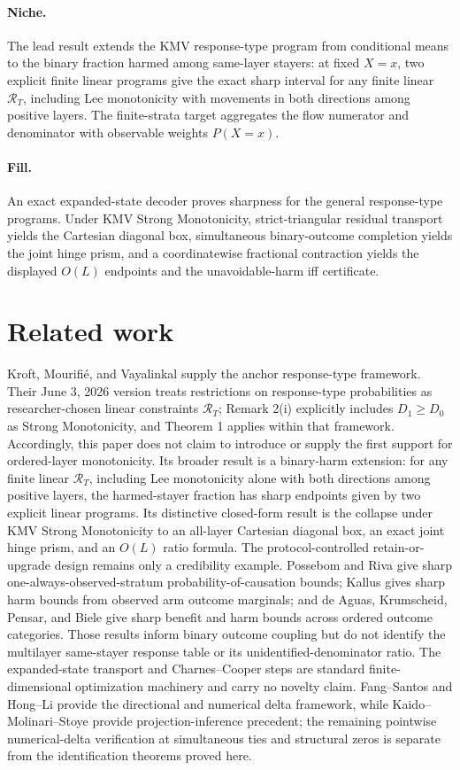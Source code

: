 \documentclass{article}
\begin{document}
\paragraph{Niche.} The lead result extends the KMV response-type program from conditional means to the binary fraction harmed among same-layer stayers: at fixed \(X=x\), two explicit finite linear programs give the exact sharp interval for any finite linear \(\mathcal R_T\), including Lee monotonicity with movements in both directions among positive layers. The finite-strata target aggregates the flow numerator and denominator with observable weights \(P(X=x)\).

\paragraph{Fill.} An exact expanded-state decoder proves sharpness for the general response-type programs. Under KMV Strong Monotonicity, strict-triangular residual transport yields the Cartesian diagonal box, simultaneous binary-outcome completion yields the joint hinge prism, and a coordinatewise fractional contraction yields the displayed \(O(L)\) endpoints and the unavoidable-harm iff certificate.

\section{Related work}

Kroft, Mourifi\'e, and Vayalinkal supply the anchor response-type framework. Their June 3, 2026 version treats restrictions on response-type probabilities as researcher-chosen linear constraints \(\mathcal R_T\); Remark 2(i) explicitly includes \(D_1\ge D_0\) as Strong Monotonicity, and Theorem 1 applies within that framework. Accordingly, this paper does not claim to introduce or supply the first support for ordered-layer monotonicity. Its broader result is a binary-harm extension: for any finite linear \(\mathcal R_T\), including Lee monotonicity alone with both directions among positive layers, the harmed-stayer fraction has sharp endpoints given by two explicit linear programs. Its distinctive closed-form result is the collapse under KMV Strong Monotonicity to an all-layer Cartesian diagonal box, an exact joint hinge prism, and an \(O(L)\) ratio formula. The protocol-controlled retain-or-upgrade design remains only a credibility example. Possebom and Riva give sharp one-always-observed-stratum probability-of-causation bounds; Kallus gives sharp harm bounds from observed arm outcome marginals; and de Aguas, Krumscheid, Pensar, and Biele give sharp benefit and harm bounds across ordered outcome categories. Those results inform binary outcome coupling but do not identify the multilayer same-stayer response table or its unidentified-denominator ratio. The expanded-state transport and Charnes--Cooper steps are standard finite-dimensional optimization machinery and carry no novelty claim. Fang--Santos and Hong--Li provide the directional and numerical delta framework, while Kaido--Molinari--Stoye provide projection-inference precedent; the remaining pointwise numerical-delta verification at simultaneous ties and structural zeros is separate from the identification theorems proved here.
\end{document}
